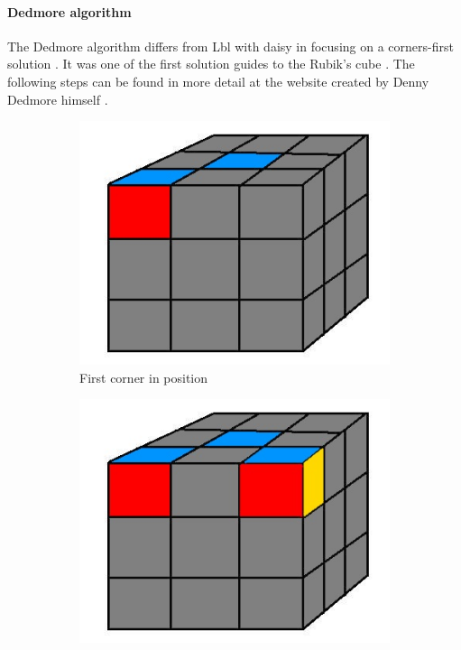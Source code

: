 \documentclass[a4paper,11pt]{kth-mag}
\begin{document}
\paragraph{Dedmore algorithm}
The Dedmore algorithm differs from Lbl with daisy in focusing on a corners-first solution \cite{Dedmore}. It was one of the first solution guides to the Rubik's cube \cite{Ijsat}. The following steps can be found in more detail at the website created by Denny Dedmore himself \cite{Dedmore}.\\
\begin{figure}[b]
	\centering
	\begin{subfigure}[!b]{0.3\textwidth}
		\includegraphics[width=\textwidth]{figs/rubiks-frst-corner.jpg}
		\caption{First corner in position}
		\label{fig_9}
	\end{subfigure}
	\begin{subfigure}[!b]{0.3\textwidth}
		\includegraphics[width=\textwidth]{figs/rubiks-scnd-corner.jpg}

\end{subfigure}
\end{figure}
\end{document}

